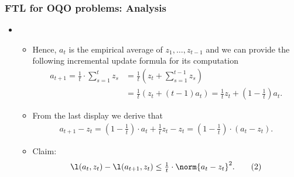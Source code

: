 \documentclass[11pt,compress,t,notes=noshow, xcolor=table]{beamer}
\begin{document}
\begin{frame} 
	\frametitle{FTL for OQO problems: Analysis}
	\small
	\begin{itemize}	
		\item[]
		\begin{itemize}	 
				\item Hence, $a_t$ is the empirical average of $z_1, \ldots, z_{t-1}$ and we can provide the following incremental update formula for its computation
				\begin{equation*}
						\begin{split}
								a_{t+1} = \tfrac{1}{t} \cdot \sum\limits_{s = 1}^{t} z_s
								&= \tfrac{1}{t}\left(z_t + \sum\limits_{s = 1}^{t-1} z_s \right)  \\
%								
								&= \tfrac{1}{t}(z_t + (t-1) a_t) 
								 =  \tfrac{1}{t} z_t + \left(1 - \tfrac{1}{t} \right)  a_t.
							\end{split}
					\end{equation*} 
				\pause
				 \item From the last display we derive that
				\begin{equation*}
						\begin{split}
								a_{t+1} - z_t = \left(1 - \tfrac{1}{t} \right) \cdot a_t + \tfrac{1}{t} z_t - z_t = \left(1 - \tfrac{1}{t} \right) \cdot (a_t - z_t).
							\end{split}
					\end{equation*}
				\pause		
				 \item Claim:
				\begin{align*} 
						\l(a_t,z_t) - \l(a_{t+1},z_t) \leq \tfrac{1}{t} \cdot \norm{a_t - z_t}^2. \tag{2}
					\end{align*}
			\end{itemize}
	\end{itemize}
\end{frame}
\end{document}
